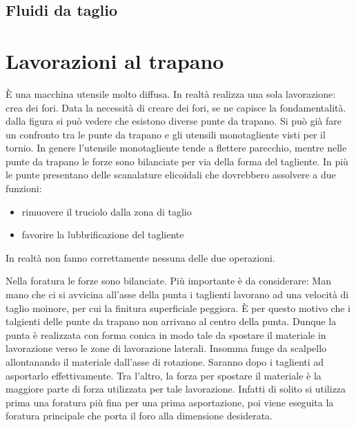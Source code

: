 \subsection{Fluidi da taglio}

\newpage
\section{Lavorazioni al trapano}
È una macchina utensile molto diffusa.
In realtà realizza una sola lavorazione: crea dei fori.
Data la necessità di creare dei fori, se ne capisce la fondamentalità.
dalla figura si può vedere che esistono diverse punte da trapano.
Si può già fare un confronto tra le punte da trapano e gli utensili
monotagliente visti per il tornio.
In genere l'utensile monotagliente tende a flettere parecchio, mentre nelle punte da trapano 
le forze sono bilanciate per via della forma del tagliente.
In più le punte presentano delle scanalature elicoidali che dovrebbero assolvere
a due funzioni:
\begin{itemize}
\item rimuovere il truciolo dalla zona di taglio
\item favorire la lubbrificazione del tagliente
\end{itemize}
In realtà non fanno correttamente nessuna delle due operazioni.


Nella foratura le forze sono bilanciate. Più importante è da considerare:
Man mano che ci si avvicina all'asse della punta i taglienti lavorano ad una velocità di taglio
moinore, per cui la finitura superficiale peggiora.
È per questo motivo che i talgienti delle punte da trapano non arrivano al centro della punta.
Dunque la punta è realizzata con forma conica in modo tale da spostare il materiale in lavorazione 
verso le zone di lavorazione laterali. Insomma funge da scalpello allontanando il materiale
dall'asse di rotazione. Saranno dopo i taglienti ad asportarlo effettivamente. 
Tra l'altro, la forza per spostare il materiale è la maggiore parte di forza utilizzata per tale lavorazione.
Infatti di solito si utilizza prima una foratura più fina per una prima asportazione, poi viene 
eseguita la foratura principale che porta il foro alla dimensione desiderata.

